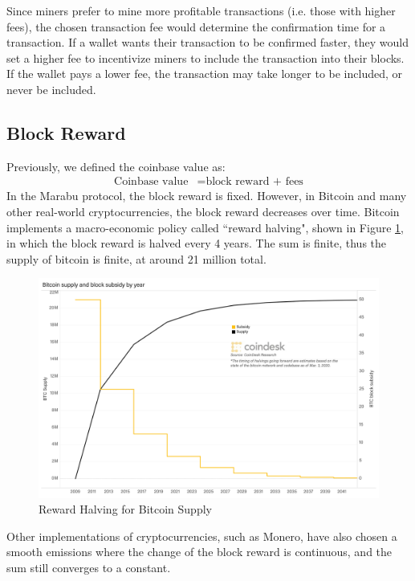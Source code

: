 Since miners prefer to mine more profitable transactions (i.e. those with higher fees), the chosen transaction fee would determine the confirmation time for a transaction. If a wallet wants their transaction to be confirmed faster, they would set a higher fee to incentivize miners to include the transaction into their blocks. If the wallet pays a lower fee, the transaction may take longer to be included, or never be included.

\subsection{Block Reward}
Previously, we defined the coinbase value as:
\begin{align*}
    \text{Coinbase value} &= \text{block reward + fees}
\end{align*}
In the Marabu protocol, the block reward is fixed. However, in Bitcoin and many other real-world cryptocurrencies, the block reward decreases over time. Bitcoin implements a macro-economic policy called ``reward halving", shown in Figure \ref{fig:reward_halving}, in which the block reward is halved every 4 years. The sum is finite, thus the supply of bitcoin is finite, at around 21 million total.

\begin{figure}[ht]
    \centering
    \includegraphics[scale = 0.2]{figures/reward_halving.png}
    \caption{Reward Halving for Bitcoin Supply\cite{halving}}
    \label{fig:reward_halving}
\end{figure}

Other implementations of cryptocurrencies, such as Monero, have also chosen a smooth emissions where the change of the block reward is continuous, and the sum still converges to a constant.


